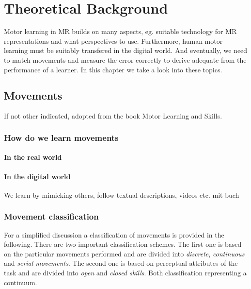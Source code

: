 \chapter{Theoretical Background}

Motor learning in MR builds on many aspects, eg. suitable technology for MR representations and what perspectives to use. Furthermore, human motor learning must be suitably transfered in the digital world. And eventually, we need to match movements and measure the error correctly to derive adequate from the performance of a learner. In this chapter we take a look into these topics. 

\section{Movements}
If not other indicated, adopted from the book Motor Learning and Skills\cite{Schmidt2011}.
\subsection{How do we learn movements}
\subsubsection{In the real world}
\subsubsection{In the digital world}
\markAonefiveFeedback
We learn by mimicking others, follow textual descriptions, videos etc. \todo mit buch

\subsection{Movement classification}
For a simplified discussion a classification of movements is provided in the following. There are two important classification schemes. The first one is based on the particular movements performed and are divided into \textit{discrete}, \textit{continuous} and \textit{serial movements}. The second one is based on perceptual attributes of the task and are divided into \textit{open} and \textit{closed skills}. Both classification representing a continuum.

